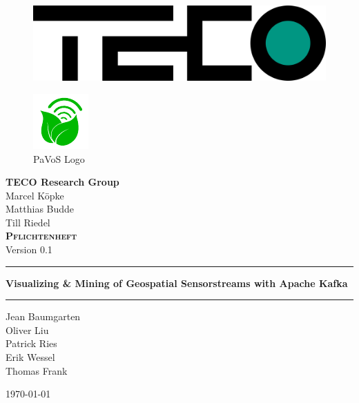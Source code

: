 \begin{titlepage}
	\begin{center}
	\begin{figure}
	\centering
	\includegraphics[width=0.5\linewidth]{images/TECOLogo.png}\\[0.5cm]
	\end{figure}
	\begin{figure}
	\centering
	\includegraphics[width=0.5\linewidth]{images/PaVoSLogo}
	\captionsetup{labelformat=empty}
	\caption{PaVoS Logo}
	\end{figure}
	
	\textbf{TECO Research Group}\\[0.2cm]
	Marcel Köpke\\Matthias Budde\\Till Riedel\\[2cm]
	
	
	\textsc{\textbf{\LARGE Pflichtenheft}}\\
	{\small Version 0.1}\\
	
	\vspace{1cm}\hrule\vspace{0.4cm}
	\textbf{\huge Visualizing \& Mining of Geospatial Sensorstreams with Apache Kafka}\\
	\vspace{0.4cm}\hrule\vspace{1cm}
	
	{\Large Jean Baumgarten\\
	Oliver Liu\\
	Patrick Ries\\
	Erik Wessel\\
	Thomas Frank\\}
	\vspace{1.5cm}

	\today
	
	\end{center}
\end{titlepage}